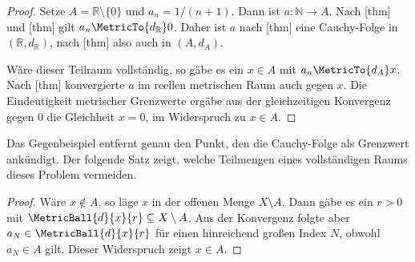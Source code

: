 \documentclass[main.tex]{subfiles}
\begin{document}
\begin{proof}
Setze \(A=\mathbb R\setminus\{0\}\) und
\(a_n=1/(n+1)\). Dann ist \(a\colon\mathbb N\to A\). Nach
[thm] und
[thm] gilt
\(a_n\MetricTo{d_{\mathbb R}}0\). Daher ist \(a\) nach
[thm] eine Cauchy-Folge in
\((\mathbb R,d_{\mathbb R})\), nach
[thm] also auch in
\((A,d_A)\).

Wäre dieser Teilraum vollständig, so gäbe es ein \(x\in A\) mit
\(a_n\MetricTo{d_A}x\). Nach
[thm] konvergierte \(a\) im
reellen metrischen Raum auch gegen \(x\). Die Eindeutigkeit metrischer
Grenzwerte ergäbe aus der gleichzeitigen Konvergenz gegen \(0\) die Gleichheit
\(x=0\), im Widerspruch zu \(x\in A\).
\end{proof}

Das Gegenbeispiel entfernt genau den Punkt, den die Cauchy-Folge als Grenzwert
ankündigt. Der folgende Satz zeigt, welche Teilmengen eines vollständigen
Raums dieses Problem vermeiden.

\begin{proof}
Wäre \(x\notin A\), so läge \(x\) in der offenen Menge
\(X\setminus A\). Dann gäbe es ein \(r>0\) mit
\(\MetricBall{d}{x}{r}\subseteq X\setminus A\). Aus der Konvergenz folgte
aber \(a_N\in\MetricBall{d}{x}{r}\) für einen hinreichend großen Index
\(N\), obwohl \(a_N\in A\) gilt. Dieser Widerspruch zeigt \(x\in A\).
\end{proof}
\end{document}
